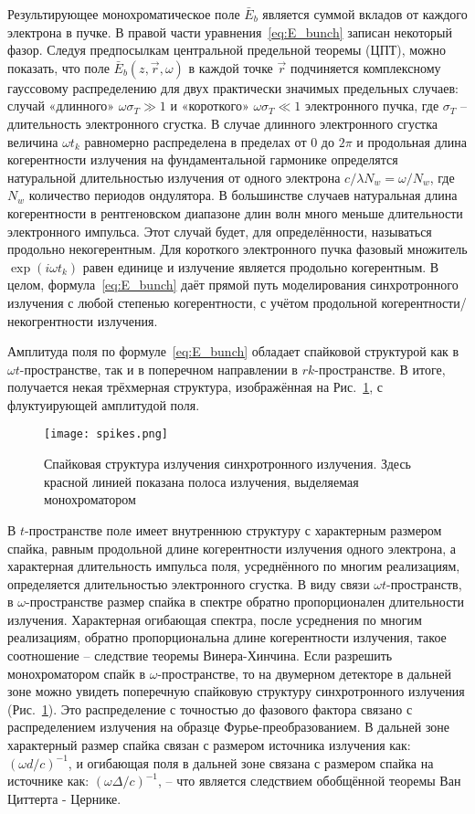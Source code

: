Результирующее монохроматическое поле $\bar{E}_{b}$ является суммой вкладов от каждого электрона в пучке. В правой части уравнения~\ref{eq:E_bunch} записан некоторый фазор. Следуя предпосылкам центральной предельной теоремы (ЦПТ), можно показать, что поле $\bar{E}_{b}(z, \vec{r}, \omega)$ в каждой точке $\vec{r}$ подчиняется комплексному гауссовому распределению для двух практически значимых предельных случаев: случай «длинного» $\omega\sigma_T \gg 1$ и «короткого»  $\omega\sigma_T \ll 1$ электронного пучка, где $\sigma_T$ -- длительность электронного сгустка. В случае длинного электронного сгустка величина $\omega t_k$ равномерно распределена в пределах от $0$ до $2\pi$ и продольная длина когерентности излучения на фундаментальной гармонике определятся натуральной длительностью излучения от одного электрона $c/\lambda N_w = \omega / N_w$, где $N_w$ количество периодов ондулятора. В большинстве случаев натуральная длина когерентности в рентгеновском диапазоне длин волн много меньше длительности электронного импульса. Этот случай будет, для определённости, называться продольно некогерентным. Для короткого электронного пучка фазовый множитель $\exp{(i \omega t_k)}$ равен единице и излучение является продольно когерентным. В целом, формула~\ref{eq:E_bunch} даёт прямой путь моделирования синхротронного излучения с любой степенью когерентности, с учётом продольной когерентности/некогрентности излучения.

Амплитуда поля по формуле~\ref{eq:E_bunch} обладает спайковой структурой как в $\omega t$-пространстве, так и в поперечном направлении в $rk$-пространстве. В итоге, получается некая трёхмерная структура, изображённая на Рис.~\ref{fig:spikes}, с флуктуирующей амплитудой поля. 
\begin{figure}[H]
	\centering 	\texttt{[image: spikes.png]}
	\caption{Спайковая структура излучения синхротронного излучения. Здесь красной линией показана полоса излучения, выделяемая монохроматором}
	\label{fig:spikes}
\end{figure}
\noindent В $t$-пространстве поле имеет внутреннюю структуру с характерным размером спайка, равным продольной длине когерентности излучения одного электрона, а характерная длительность импульса поля, усреднённого по многим реализациям, определяется длительностью электронного сгустка. В виду связи $\omega t$-пространств, в $\omega$-пространстве размер спайка в спектре обратно пропорционален длительности излучения. Характерная огибающая спектра, после усреднения по многим реализациям, обратно пропорциональна длине когерентности излучения, такое соотношение -- следствие теоремы Винера-Хинчина. Если разрешить монохроматором спайк в $\omega$-пространстве, то на двумерном детекторе в дальней зоне можно увидеть поперечную спайковую структуру синхротронного излучения (Рис.~\ref{fig:spikes}). Это распределение с точностью до фазового фактора связано с распределением излучения на образце Фурье-преобразованием. В дальней зоне характерный размер спайка связан с размером источника излучения как:  $(\omega d /c)^{-1}$, и огибающая поля в дальней зоне связана с размером спайка на источнике как: $(\omega \Delta /c)^{-1}$, -- что является следствием обобщённой теоремы Ван Циттерта - Цернике. 


\newpage






